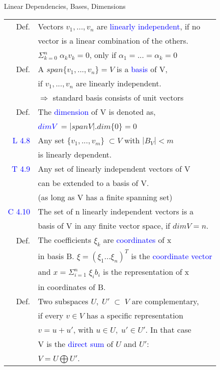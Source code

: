 \begin{mainbox}{Linear Dependencies, Bases, Dimensions}
\setlength{\tabcolsep}{2pt}
\begin{tabular}{rl}
	Def. & Vectors $v_1, ..., v_n$ are \textcolor{blue}{linearly independent}, if no\\
	& vector is a linear combination of the others.\\
	& $\Sigma_{k=0}^{n}\;\alpha_k v_k = 0$, only if $\alpha_1 = ... = \alpha_k = 0$ \\
	\rule{0pt}{3ex} 
	Def. & A $span\{v_1, ..., v_n\} = V$ is a \textcolor{blue}{basis} of V,\\
	& if $v_1, ..., v_n$ are linearly independent.\\ 
	& $\Rightarrow$ standard basis consists of unit vectors\\
	\rule{0pt}{3ex} 
	Def. & The \textcolor{blue}{dimension} of V is denoted as,\\
	& \textcolor{blue}{$dimV$} $=|spanV|$.\quad$dim\{0\} = 0$\\
	\rule{0pt}{3ex} 
	\textcolor{blue}{L 4.8} & Any set $\{v_1, ..., v_m\}\;\subset V$ with $|B_V| < m$ \\
	& is linearly dependent.\\
	\rule{0pt}{3ex} 
	\textcolor{blue}{T 4.9} & Any set of linearly independent vectors of V\\
	& can be extended to a basis of V.\\
	& (as long as V has a finite spanning set)\\
	\rule{0pt}{3ex} 
	\textcolor{blue}{C 4.10} & The set of n linearly independent vectors is a\\
	& basis of V in any finite vector space, if $dimV = n$.\\
	\rule{0pt}{3ex}
	Def. & The coefficients $\xi_k$ are \textcolor{blue}{coordinates} of x\\
	& in basis B. $\xi = (\xi_1 ... \xi_n)^T$ is the \textcolor{blue}{coordinate vector}\\
	& and $x = \Sigma_{i=1}^n\;\xi_ib_i$ is the representation of x\\
	& in coordinates of B.\\
	\rule{0pt}{3ex}
	Def. & Two subspaces $U,\;U'\;\subset\;V$ are complementary,\\
	& if every $v\in V$ has a specific representation \\
	& $v=u+u'$, with $u\in U,\; u' \in U'$. In that case\\
	& V is the \textcolor{blue}{direct sum} of $U$ and $U'$:\\
	& $V = U \bigoplus U'$.\\
\end{tabular}
\end{mainbox}